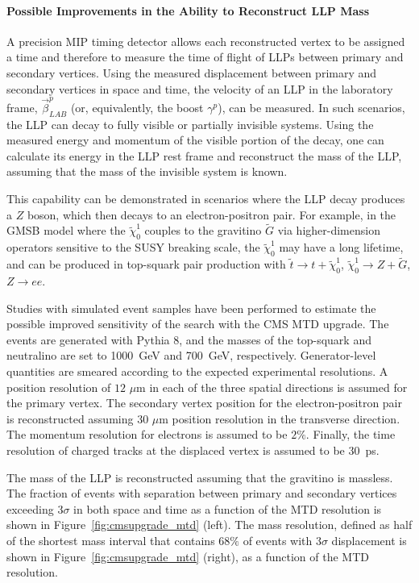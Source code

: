 \paragraph{Possible Improvements in the Ability to Reconstruct LLP Mass}

A precision MIP timing detector allows each reconstructed vertex to be assigned a time and therefore to measure the time of flight of LLPs between primary and secondary vertices. Using the measured displacement between primary and secondary vertices in space and time, the velocity of an LLP in the laboratory frame, $\vec{\beta}_{LAB}^{p}$ (or, equivalently, the boost $\gamma^p$), can be measured. In such scenarios, the LLP can decay to fully visible or partially invisible systems. Using the measured energy and momentum of the visible portion of the decay, one can calculate its energy in the LLP rest frame and reconstruct the mass of the LLP, assuming that the mass of the invisible system is known.

This capability can be demonstrated in scenarios where the LLP decay produces a $Z$ boson, which then decays to an electron-positron pair. For example, in the GMSB model where the $\tilde{\chi}_0^1$ couples to the gravitino $\tilde{G}$ via higher-dimension operators sensitive to the SUSY breaking scale, the $\tilde{\chi}_0^1$ may have a long lifetime, and can be produced in top-squark pair production with $\tilde{t}\to t+\tilde{\chi}_0^1$, $\tilde{\chi}_0^1 \to Z+\tilde{G}$, $Z\to ee$.

Studies with simulated event samples have been performed to estimate the possible improved sensitivity of the search with the CMS MTD upgrade. The events are generated with Pythia 8, and the masses of the top-squark and neutralino are set to 1000~GeV and 700~GeV, respectively. Generator-level quantities are smeared according to the expected experimental resolutions. A position resolution of $12\,\,\mu\mathrm{m}$ in each of the three spatial directions is assumed for the primary vertex. The secondary vertex position for the electron-positron pair is reconstructed assuming $30\,\,\mu\mathrm{m}$ position resolution in the transverse direction. The momentum resolution for electrons is assumed to be $2\%$. Finally, the time resolution of charged tracks at the displaced vertex is assumed to be 30~ps.

The mass of the LLP is reconstructed assuming that the gravitino is massless. The fraction of events with separation between primary and secondary vertices exceeding 3$\sigma$ in both space and time as a function of the MTD resolution is shown in Figure~\ref{fig:cmsupgrade_mtd} (left). The mass resolution, defined as half of the shortest mass interval that contains $68\%$ of events with 3$\sigma$ displacement is shown in Figure~\ref{fig:cmsupgrade_mtd} (right), as a function of the MTD resolution.

